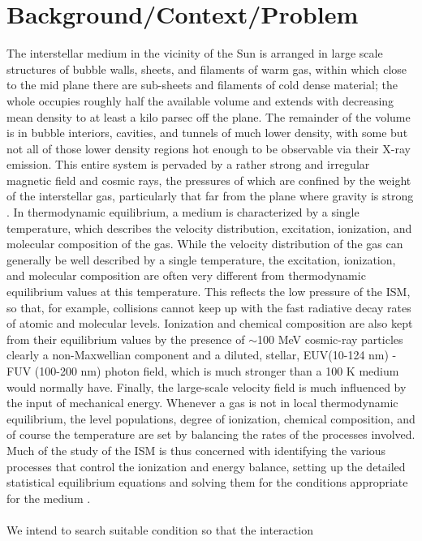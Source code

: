 \documentclass[fleqn,a4paper,12pt,oneside]{article}
\begin{document}
\section{ Background/Context/Problem}
  The interstellar medium in the vicinity of the Sun is arranged in
large scale structures of bubble walls, sheets, and filaments of
warm gas, within which close to the mid plane there are sub-sheets
and filaments of cold dense material; the whole occupies roughly
half the available volume and extends with decreasing mean density
to at least a kilo parsec off the plane. The remainder of the
volume is in bubble interiors, cavities, and tunnels of much lower
density, with some but not all of those lower density regions hot
enough to be observable via their X-ray emission. This entire
system is pervaded by a rather strong and irregular magnetic field
and cosmic rays, the pressures of which are confined by the weight
of the interstellar gas, particularly that far from the plane
where gravity is strong \cite{4}. In thermodynamic equilibrium, a
medium is characterized by a single temperature, which describes
the velocity distribution, excitation, ionization, and molecular
composition of the gas. While the velocity distribution of the gas
can generally be well described by a single temperature, the
excitation, ionization, and molecular composition are often very
different from thermodynamic equilibrium values at this
temperature. This reflects the low pressure of the ISM, so that,
for example, collisions cannot keep up with the fast radiative
decay rates of atomic and molecular levels. Ionization and
chemical composition are also kept from their equilibrium values
by the presence of $\sim$100 MeV cosmic-ray particles clearly a
non-Maxwellian component and a diluted, stellar, EUV(10-124 nm) -
FUV (100-200 nm) photon field, which is much stronger than a 100 K
medium would normally have. Finally, the large-scale velocity
field is much influenced by the input of mechanical energy.
Whenever a gas is not in local thermodynamic equilibrium, the
level populations, degree of ionization, chemical composition, and
of course the temperature are set by balancing the rates of the
processes involved. Much of the study of the ISM is thus concerned
with identifying the various processes that control the ionization
and energy balance, setting up the detailed statistical
equilibrium equations and solving them for the conditions
appropriate for the medium \cite{5}.
\\
\\
We intend to search suitable condition so that the interaction
\end{document}
